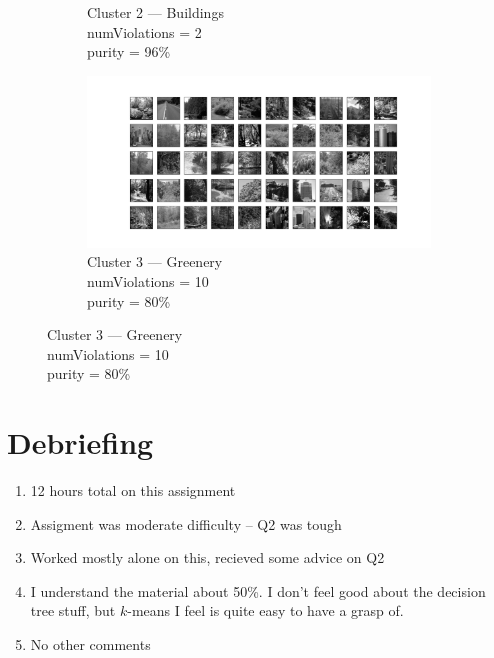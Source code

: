 \documentclass{article}
\theoremstyle{definition}
\begin{document}
\begin{figure}
\begin{subfigure}{\textwidth}
\begin{minipage}[c]{0.67\textwidth}
              \end{minipage}\hfill
              \begin{minipage}[c]{0.3\textwidth}
                \caption{
                    Cluster 2 --- Buildings \\
                    numViolations = 2 \\
                    purity = 96\%
                } \label{fig:}
              \end{minipage}
            \end{subfigure}
            \begin{subfigure}{\textwidth}
              \begin{minipage}[c]{0.67\textwidth}
                \includegraphics[width=\textwidth]{figures/q7_b_3.png}
              \end{minipage}\hfill
              \begin{minipage}[c]{0.3\textwidth}
                \caption{
                    Cluster 3 --- Greenery \\
                    numViolations = 10 \\
                    purity = 80\%
                } \label{fig:}
              \end{minipage}
            \end{subfigure}
        \end{figure}
\section{Debriefing}
    \begin{enumerate}
        \item 12 hours total on this assignment
        \item Assigment was moderate difficulty -- Q2 was tough
        \item Worked mostly alone on this, recieved some advice on Q2
        \item I understand the material about 50\%. I don't feel good about 
            the decision tree stuff, but $k$-means I feel is quite easy to 
            have a grasp of.
        \item No other comments
    \end{enumerate}
\end{document}

